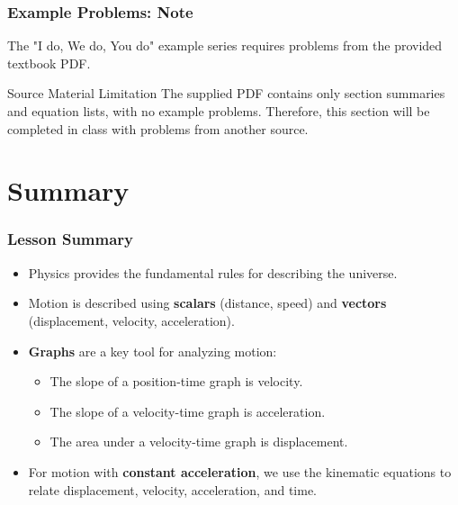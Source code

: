 \documentclass{beamer}
\begin{document}
\begin{frame}
\frametitle{Example Problems: Note}
The "I do, We do, You do" example series requires problems from the provided textbook PDF.
\vspace{1cm}
\begin{alertblock}{Source Material Limitation}
The supplied PDF contains only section summaries and equation lists, with no example problems.
\vspace{0.5cm}
Therefore, this section will be completed in class with problems from another source.
\end{alertblock}
\end{frame}

\section{Summary}

\begin{frame}
\frametitle{Lesson Summary}
\begin{itemize}
    \item Physics provides the fundamental rules for describing the universe.
    \item Motion is described using \textbf{scalars} (distance, speed) and \textbf{vectors} (displacement, velocity, acceleration).
    \item \textbf{Graphs} are a key tool for analyzing motion:
        \begin{itemize}
            \item The slope of a position-time graph is \alert{velocity}.
            \item The slope of a velocity-time graph is \alert{acceleration}.
            \item The area under a velocity-time graph is \alert{displacement}.
        \end{itemize}
    \item For motion with \textbf{constant acceleration}, we use the kinematic equations to relate displacement, velocity, acceleration, and time.
\end{itemize}
\end{frame}
\end{document}
